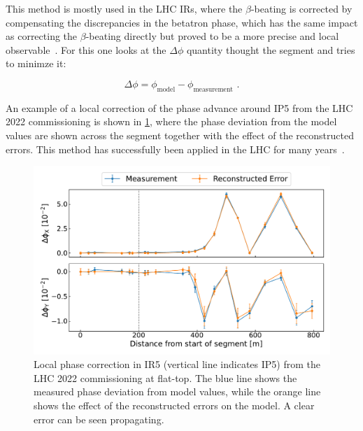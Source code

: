 This method is mostly used in the LHC IRs, where the \(\beta\)-beating is corrected by compensating the discrepancies in the betatron phase, which has the same impact as correcting the \(\beta\)-beating directly but proved to be a more precise and local observable~\cite{PRAB:Tomas:CERN_LHC_OMC}.
For this one looks at the \(\Delta \phi\) quantity thought the segment and tries to minimze it:

\begin{equation}
  \Delta \phi = \phi_{\mathrm{model}} - \phi_{\mathrm{measurement}} \text{ .}
  \label{equation:sbs_delta_phi}
\end{equation}

An example of a local correction of the phase advance around IP\num{5} from the LHC \num{2022} commissioning is shown in \cref{figure:example_sbs_correction}, where the phase deviation from the model values are shown across the segment together with the effect of the reconstructed errors.
This method has successfully been applied in the LHC for many years~\cite{PRAB:Aiba:First_Beating_Measurement_LHC,PRAB:Tomas:Record_Low_Beta_Beating_in_the_LHC,PRAB:Persson:LHC_Optics_Commissioning_OnePercent}.

\begin{figure}[!hbt]
  \centering
  \includegraphics*[width=0.99\linewidth]{Figures/Optics_Measurements_Corrections_at_LHC/sbs_phase_ip5_example.pdf}
  \caption{Local phase correction in IR\num{5} (vertical line indicates IP\num{5}) from the LHC \num{2022} commissioning at flat-top. The \textcolor{mplblue}{blue} line shows the measured phase deviation from model values, while the \textcolor{mplorange}{orange} line shows the effect of the reconstructed errors on the model. A clear error can be seen propagating.}
  \label{figure:example_sbs_correction}
\end{figure}

